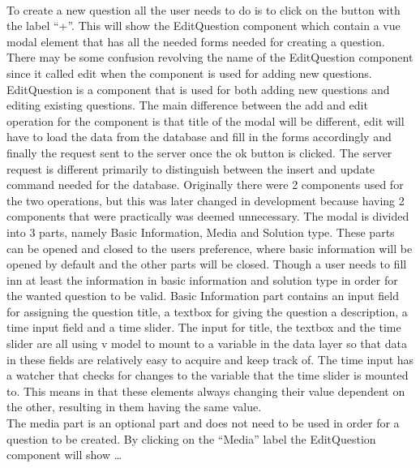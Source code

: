 \\[11pt]
To create a new question all the user needs to do is to click on the button with the label “+”. This will show the EditQuestion component which contain a vue modal element that has all the needed forms needed for creating a question. There may be some confusion revolving the name of the EditQuestion component since it called edit when the component is used for adding new questions. EditQuestion is a component that is used for both adding new questions and editing existing questions. The main difference between the add and edit operation for the component is that title of the modal will be different, edit will have to load the data from the database and fill in the forms accordingly and finally the request sent to the server once the ok button is clicked. The server request is different primarily to distinguish between the insert and update command needed for the database. Originally there were 2 components used for the two operations, but this was later changed in development because having 2 components that were practically was deemed unnecessary. The modal is divided into 3 parts, namely Basic Information, Media and Solution type.  These parts can be opened and closed to the users preference, where basic information will be opened by default and the other parts will be closed. Though a user needs to fill inn at least the information in basic information and solution type in order for the wanted question to be valid. Basic Information part contains an input field for assigning the question title, a textbox for giving the question a description, a time input field and a time slider. The input for title, the textbox and the time slider are all using v model to mount to a variable in the data layer so that data in these fields are relatively easy to acquire and keep track of. The time input has a watcher that checks for changes to the variable that the time slider is mounted to. This means in that these elements always changing their value dependent on the other, resulting in them having the same value.\\[11pt]
The media part is an optional part and does not need to be used in order for a question to be created. By clicking on the “Media” label the EditQuestion component will show … 
